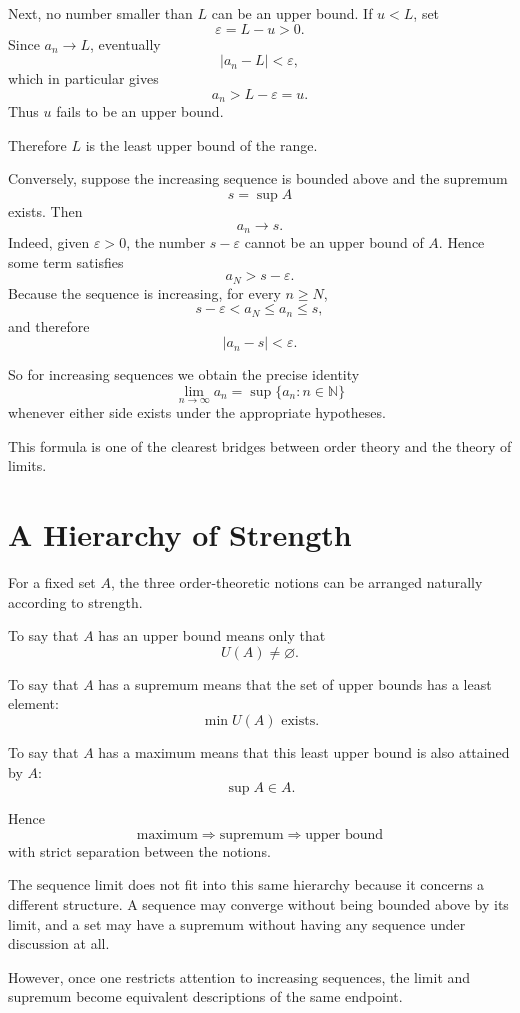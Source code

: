 \documentclass{essay}
\begin{document}
Next, no number smaller than $L$ can be an upper bound. If $u<L$, set
\[
    \varepsilon=L-u>0.
\]
Since $a_n\to L$, eventually
\[
    |a_n-L|<\varepsilon,
\]
which in particular gives
\[
    a_n>L-\varepsilon=u.
\]
Thus $u$ fails to be an upper bound.

Therefore $L$ is the least upper bound of the range.

Conversely, suppose the increasing sequence is bounded above and the supremum
\[
    s=\sup A
\]
exists. Then
\[
    a_n\to s.
\]
Indeed, given $\varepsilon>0$, the number $s-\varepsilon$ cannot be an upper bound of $A$. Hence some term satisfies
\[
    a_N>s-\varepsilon.
\]
Because the sequence is increasing, for every $n\geq N$,
\[
    s-\varepsilon<a_N\leq a_n\leq s,
\]
and therefore
\[
    |a_n-s|<\varepsilon.
\]

So for increasing sequences we obtain the precise identity
\[
    \boxed{\lim_{n\to\infty}a_n=\sup\{a_n:n\in\mathbb{N}\}}
\]
whenever either side exists under the appropriate hypotheses.

This formula is one of the clearest bridges between order theory and the theory of limits.

\section{A Hierarchy of Strength}

For a fixed set $A$, the three order-theoretic notions can be arranged naturally according to strength.

To say that $A$ has an upper bound means only that
\[
    U(A)\neq\varnothing.
\]

To say that $A$ has a supremum means that the set of upper bounds has a least element:
\[
    \min U(A)\text{ exists}.
\]

To say that $A$ has a maximum means that this least upper bound is also attained by $A$:
\[
    \sup A\in A.
\]

Hence
\[
    \boxed{
    \text{maximum}
    \Longrightarrow
    \text{supremum}
    \Longrightarrow
    \text{upper bound}
    }
\]
with strict separation between the notions.

The sequence limit does not fit into this same hierarchy because it concerns a different structure. A sequence may converge without being bounded above by its limit, and a set may have a supremum without having any sequence under discussion at all.

However, once one restricts attention to increasing sequences, the limit and supremum become equivalent descriptions of the same endpoint.
\end{document}
